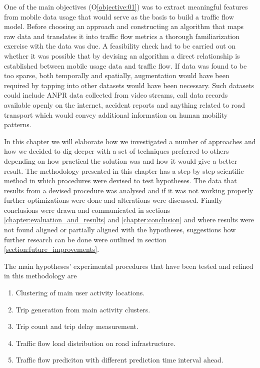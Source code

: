 \documentclass[12pt, a4paper]{report}
\theoremstyle{definition}
\theoremstyle{definition}%
\theoremstyle{definition}%
\theoremstyle{definition}%
\theoremstyle{definition}%
\theoremstyle{definition}%
\begin{document}
One of the main objectives (O\ref{objective:01}) was to extract meaningful features from mobile data usage that would serve as the basis to build a traffic flow model. Before choosing an approach and constructing an algorithm that maps raw data and translates it into traffic flow metrics a thorough familiarization exercise with the data was due. A feasibility check had to be carried out on whether it was possible that by devising an algorithm a direct relationship is established between mobile usage data and traffic flow. If data was found to be too sparse, both temporally and spatially,  augmentation would have been required by tapping into other datasets would have been necessary. Such  datasets could include ANPR data collected from video streams, call data records available openly on the internet, accident reports and anything related to road transport which would convey additional information on human mobility patterns. 

In this chapter we will elaborate how we investigated a number of approaches and how we decided to dig deeper with a set of techniques preferred to others depending on how practical the solution was and how it would give a better result. The methodology presented in this chapter has a step by step scientific method in which procedures were devised to test hypotheses. The data that results from a devised procedure was analysed and if it was not working properly further optimizations were done and alterations were discussed. Finally conclusions were drawn and communicated in sections \ref{chapter:evaluation_and_results} and \ref{chapter:conclusion}  and where results were not found aligned or partially aligned with the hypotheses, suggestions how further research can be done were outlined in section \ref{section:future_improvements}. 

The main hypotheses' experimental procedures that have been tested and refined in this methodology are 

\begin{enumerate}
	
	\item Clustering of main user activity locations. 
	\item Trip generation from main activity clusters.
	\item Trip count and trip delay measurement.
	\item Traffic flow load distribution on road infrastructure. 
	\item Traffic flow prediciton with different prediction time interval ahead.
	
\end{enumerate}
\end{document}
